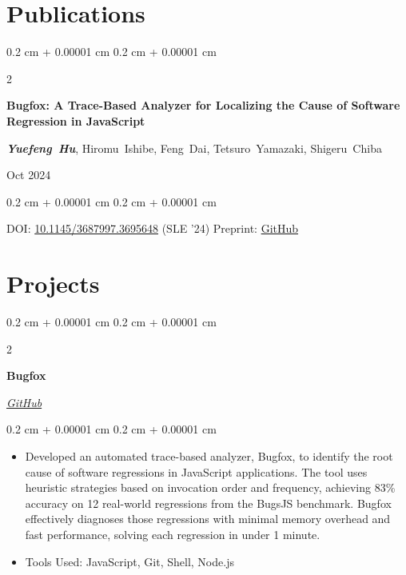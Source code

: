 \documentclass[10pt, letterpaper]{article}
\newenvironment{highlights}{
    \begin{itemize}[
        topsep=0.10 cm,
        parsep=0.10 cm,
        partopsep=0pt,
        itemsep=0pt,
        leftmargin=0.4 cm + 10pt
    ]
}{
    \end{itemize}
} %
\newenvironment{onecolentry}{
    \begin{adjustwidth}{
        0.2 cm + 0.00001 cm
    }{
        0.2 cm + 0.00001 cm
    }
}{
    \end{adjustwidth}
} %
\newenvironment{twocolentry}[2][]{
    \onecolentry
    \def\secondColumn{#2}
    \setcolumnwidth{\fill, 4.5 cm}
    \begin{paracol}{2}
}{
    \switchcolumn \raggedleft \secondColumn
    \end{paracol}
    \endonecolentry
} %
\begin{document}
    
    \section{Publications}



        
        \begin{samepage}
            \begin{twocolentry}{
                Oct 2024
            }
                \textbf{Bugfox: A Trace-Based Analyzer for Localizing the Cause of Software Regression in JavaScript}

                \vspace{0.10 cm}

                \mbox{\textbf{\textit{Yuefeng Hu}}}, \mbox{Hiromu Ishibe}, \mbox{Feng Dai}, \mbox{Tetsuro Yamazaki}, \mbox{Shigeru Chiba}
            \end{twocolentry}


            \vspace{0.10 cm}

            \begin{onecolentry}
				DOI: \href{https://doi.org/10.1145/3687997.3695648}{10.1145/3687997.3695648} (SLE '24)    
				\qquad 
				Preprint: \href{https://icefox99.github.io/publ/SLE2024-Bugfox.pdf}{GitHub}	
			\end{onecolentry}
        \end{samepage}


    
    \section{Projects}



        
        \begin{twocolentry}{
            
            
        \textit{\href{https://github.com/IceFox99/Bugfox}{GitHub}}}
            \textbf{Bugfox}
        \end{twocolentry}

        \vspace{0.10 cm}
        \begin{onecolentry}
            \begin{highlights}
                \item Developed an automated trace-based analyzer, Bugfox, to identify the root cause of software regressions in JavaScript applications. The tool uses heuristic strategies based on invocation order and frequency, achieving 83\% accuracy on 12 real-world regressions from the BugsJS benchmark. Bugfox effectively diagnoses those regressions with minimal memory overhead and fast performance, solving each regression in under 1 minute.
                \item Tools Used: JavaScript, Git, Shell, Node.js
            \end{highlights}
        \end{onecolentry}
\end{document}
